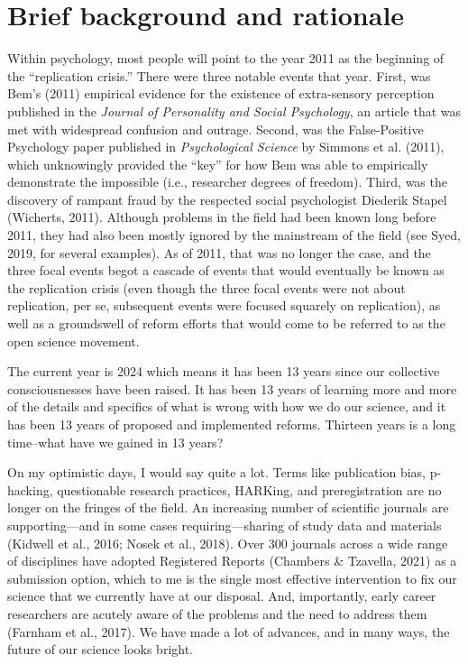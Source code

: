\documentclass[authordate, empirical,issue]{jote-new-article}
\begin{document}
\section{Brief background and rationale}







Within psychology, most people will point to the year 2011 as the beginning of the “replication crisis.” There were three notable events that year. First, was Bem’s (2011) empirical evidence for the existence of extra-sensory perception published in the \emph{Journal of Personality and Social Psychology}, an article that was met with widespread confusion and outrage. Second, was the False-Positive Psychology paper published in \emph{Psychological Science} by Simmons et al. (2011), which unknowingly provided the “key” for how Bem was able to empirically demonstrate the impossible (i.e., researcher degrees of freedom). Third, was the discovery of rampant fraud by the respected social psychologist Diederik Stapel (Wicherts, 2011). Although problems in the field had been known long before 2011, they had also been mostly ignored by the mainstream of the field (see Syed, 2019, for several examples). As of 2011, that was no longer the case, and the three focal events begot a cascade of events that would eventually be known as the replication crisis (even though the three focal events were not about replication, per se, subsequent events were focused squarely on replication), as well as a groundswell of reform efforts that would come to be referred to as the open science movement.







The current year is 2024 which means it has been 13 years since our collective consciousnesses have been raised. It has been 13 years of learning more and more of the details and specifics of what is wrong with how we do our science, and it has been 13 years of proposed and implemented reforms. Thirteen years is a long time--what have we gained in 13 years?







On my optimistic days, I would say quite a lot. Terms like publication bias, p-hacking, questionable research practices, HARKing, and preregistration are no longer on the fringes of the field. An increasing number of scientific journals are supporting—and in some cases requiring—sharing of study data and materials (Kidwell et al., 2016; Nosek et al., 2018). Over 300 journals across a wide range of disciplines have adopted Registered Reports (Chambers \& Tzavella, 2021) as a submission option, which to me is the single most effective intervention to fix our science that we currently have at our disposal. And, importantly, early career researchers are acutely aware of the problems and the need to address them (Farnham et al., 2017). We have made a lot of advances, and in many ways, the future of our science looks bright.
\end{document}
